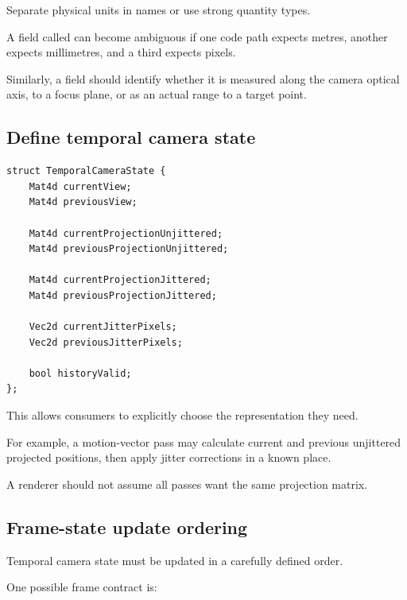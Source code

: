 Separate physical units in names or use strong quantity types.

A field called  can become ambiguous if one code path expects metres, another expects millimetres, and a third expects pixels.

Similarly, a  field should identify whether it is measured along the camera optical axis, to a focus plane, or as an actual range to a target point.

\subsection{Define temporal camera state}\label{02-foundations-ii-ch037-define-temporal-camera-state}

\hypertarget{02-foundations-ii-ch037-define-temporal-camera-state}{}

\begin{verbatim}
struct TemporalCameraState {
    Mat4d currentView;
    Mat4d previousView;

    Mat4d currentProjectionUnjittered;
    Mat4d previousProjectionUnjittered;

    Mat4d currentProjectionJittered;
    Mat4d previousProjectionJittered;

    Vec2d currentJitterPixels;
    Vec2d previousJitterPixels;

    bool historyValid;
};
\end{verbatim}

This allows consumers to explicitly choose the representation they need.

For example, a motion-vector pass may calculate current and previous unjittered projected positions, then apply jitter corrections in a known place.

A renderer should not assume all passes want the same projection matrix.

\subsection{Frame-state update ordering}\label{02-foundations-ii-ch037-frame-state-update-ordering}

\hypertarget{02-foundations-ii-ch037-frame-state-update-ordering}{}

Temporal camera state must be updated in a carefully defined order.

One possible frame contract is:

